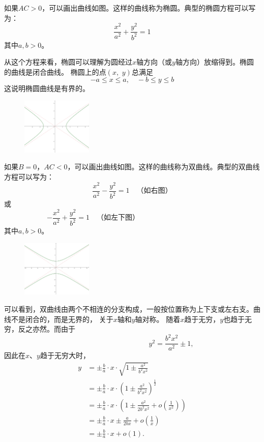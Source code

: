 \documentclass[12pt,UTF8]{ctexbook}
\newcommand{\olim}[1]{\mathit{o}\left(#1\right)}  %
\theoremstyle{definition}
\theoremstyle{plain}
\begin{document}
如果$AC > 0$，可以画出曲线如图。这样的曲线称为椭圆。典型的椭圆方程可以写为：
$$ \frac{x^2}{a^2} + \frac{y^2}{b^2} = 1 $$
其中$a,b>0$。

从这个方程来看，椭圆可以理解为圆经过$x$轴方向（或$y$轴方向）放缩得到。椭圆的曲线是闭合曲线。
椭圆上的点$(x,\,\,y)$总满足
$$ -a \leqslant x \leqslant a, \quad -b \leqslant y \leqslant b$$
这说明椭圆曲线是有界的。

\begin{figure} %
    \vspace{-12pt}
    \flushright
    \includegraphics[width=0.3\textwidth]{tu/双曲线1.png}
\end{figure}

如果$B = 0$，$AC < 0$，可以画出曲线如图。这样的曲线称为双曲线。典型的双曲线方程可以写为：
$$ \frac{x^2}{a^2} - \frac{y^2}{b^2} = 1 \quad \mbox{（如右图）}$$
或
$$ - \frac{x^2}{a^2} + \frac{y^2}{b^2} = 1  \quad \mbox{（如左下图）} \qquad  \qquad  \qquad  \qquad \;\: \quad \phantom{123}$$
其中$a,b>0$。

\begin{figure} 
    \vspace{-28pt}
    \flushright
    \includegraphics[width=0.3\textwidth]{tu/双曲线2.png}
\end{figure}

可以看到，双曲线由两个不相连的分支构成，一般按位置称为上下支或左右支。曲线不是闭合的，而是无界的，
关于$x$轴和$y$轴对称。
随着$x$趋于无穷，$y$也趋于无穷，反之亦然。而由于
$$ \phantom{123455}\qquad \qquad \qquad \qquad y^2 = \frac{b^2x^2}{a^2} \pm 1, $$
因此在$x$、$y$趋于无穷大时，
\begin{align*}
    y &= \pm \frac{b}{a} \cdot x \cdot \sqrt{1 \pm \frac{a^2}{b^2x^2}} \\ 
    &= \pm \frac{b}{a} \cdot x \cdot \left(1 \pm \frac{a^2}{b^2x^2}\right)^{\frac{1}{2}} \\
    &= \pm \frac{b}{a} \cdot x \cdot \left(1 \pm \frac{a^2}{2b^2x^2} + \olim{\frac{1}{x^2}} \right)\\
    &= \pm \frac{b}{a} \cdot x \pm \frac{a}{2bx} + \olim{\frac{1}{x}} \\
    &= \pm \frac{b}{a} \cdot x + \olim{1}.
\end{align*}
\end{document}
